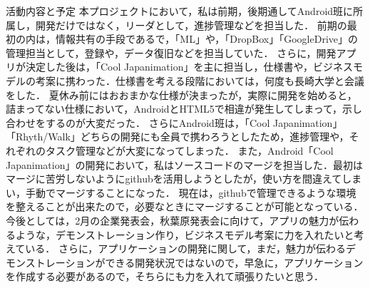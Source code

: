 \per
活動内容と予定
\per
本プロジェクトにおいて，私は前期，後期通してAndroid班に所属し，開発だけではなく，リーダとして，進捗管理などを担当した．
前期の最初の内は，情報共有の手段であるで，「ML」や，「DropBox」「GoogleDrive」の管理担当として，登録や，データ復旧などを担当していた．
さらに，開発アプリが決定した後は，「Cool Japanimation」を主に担当し，仕様書や，ビジネスモデルの考案に携わった．仕様書を考える段階においては，何度も長崎大学と会議をした．
夏休み前にはおおまかな仕様が決まったが，実際に開発を始めると，詰まってない仕様において，AndroidとHTML5で相違が発生してしまって，示し合わせをするのが大変だった．
さらにAndroid班は，「Cool Japanimation」「Rhyth/Walk」どちらの開発にも全員で携わろうとしたため，進捗管理や，それぞれのタスク管理などが大変になってしまった．
また，Android「Cool Japanimation」の開発において，私はソースコードのマージを担当した．最初はマージに苦労しないようにgithubを活用しようとしたが，使い方を間違えてしまい，手動でマージすることになった．
現在は，githubで管理できるような環境を整えることが出来たので，必要なときにマージすることが可能となっている．
\per
今後としては，2月の企業発表会，秋葉原発表会に向けて，アプリの魅力が伝わるような，デモンストレーション作り，ビジネスモデル考案に力を入れたいと考えている．
さらに，アプリケーションの開発に関して，まだ，魅力が伝わるデモンストレーションができる開発状況ではないので，早急に，アプリケーションを作成する必要があるので，そちらにも力を入れて頑張りたいと思う．

